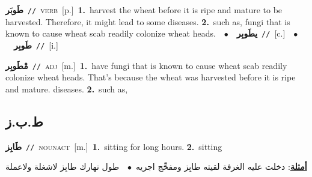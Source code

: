 \documentclass[10pt,a4paper,twoside]{article} %
\begin{document}
\begin{multicols}{2}
{\setlength\topsep{0pt}\textbf{\foreignlanguage{arabic}{طَوبَر}}\ {\color{gray}\texttt{//}\color{black}}\ \textsc{verb}\ [p.]\ \textbf{1.}~harvest the wheat before it is ripe and mature to be harvested. Therefore, it might lead to some diseases.  \textbf{2.}~such as, fungi that is known to cause wheat scab readily colonize wheat heads.\ \ $\bullet$\ \ \setlength\topsep{0pt}\textbf{\foreignlanguage{arabic}{يطَوبِر}}\ {\color{gray}\texttt{//}\color{black}}\ [c.]\ \ $\bullet$\ \ \setlength\topsep{0pt}\textbf{\foreignlanguage{arabic}{طَوبِر}}\ {\color{gray}\texttt{//}\color{black}}\ [i.]\ } \vspace{2mm}

{\setlength\topsep{0pt}\textbf{\foreignlanguage{arabic}{مْطَوبِر}}\ {\color{gray}\texttt{//}\color{black}}\ \textsc{adj}\ [m.]\ \textbf{1.}~have fungi that is known to cause wheat scab readily colonize wheat heads. That's because the wheat was harvested before it is ripe and mature. diseases.  \textbf{2.}~such as,\ } \vspace{2mm}

\vspace{-3mm}
\subsection*{\color{blue}\foreignlanguage{arabic}{ط.ب.ز}\color{blue}{}} 

{\setlength\topsep{0pt}\textbf{\foreignlanguage{arabic}{طَابِز}}\ {\color{gray}\texttt{//}\color{black}}\ \textsc{noun\textunderscore act}\ [m.]\ \textbf{1.}~sitting for long hours.  \textbf{2.}~sitting\  \begin{flushright}\color{gray}\foreignlanguage{arabic}{\textbf{\underline{\foreignlanguage{arabic}{أمثلة}}}: دخلت عليه الغرفة لقيته طابِِز ومفحِّج اجريه\ $\bullet$\ \  طول نهارك طابِز لاشغلة ولاعملة}\end{flushright}\color{black}} \vspace{2mm}


\end{multicols}
\end{document}
